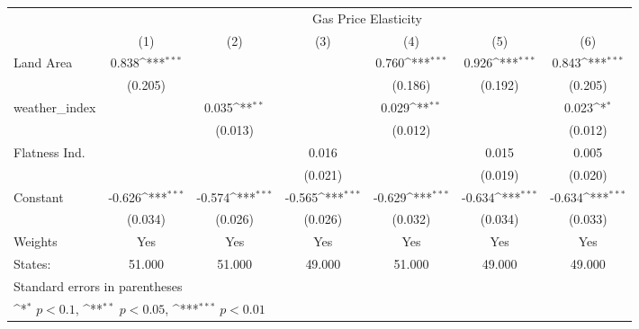 {
\def\sym#1{\ifmmode^{#1}\else\(^{#1}\)\fi}
\begin{tabular}{l*{6}{c}}
\hline\hline
            &\multicolumn{6}{c}{Gas Price Elasticity}                                                                                           \\
            &\multicolumn{1}{c}{(1)}         &\multicolumn{1}{c}{(2)}         &\multicolumn{1}{c}{(3)}         &\multicolumn{1}{c}{(4)}         &\multicolumn{1}{c}{(5)}         &\multicolumn{1}{c}{(6)}         \\
\hline
Land Area   &       0.838\sym{***}&                     &                     &       0.760\sym{***}&       0.926\sym{***}&       0.843\sym{***}\\
            &     (0.205)         &                     &                     &     (0.186)         &     (0.192)         &     (0.205)         \\
[1em]
weather\_index&                     &       0.035\sym{**} &                     &       0.029\sym{**} &                     &       0.023\sym{*}  \\
            &                     &     (0.013)         &                     &     (0.012)         &                     &     (0.012)         \\
[1em]
Flatness Ind.&                     &                     &       0.016         &                     &       0.015         &       0.005         \\
            &                     &                     &     (0.021)         &                     &     (0.019)         &     (0.020)         \\
[1em]
Constant    &      -0.626\sym{***}&      -0.574\sym{***}&      -0.565\sym{***}&      -0.629\sym{***}&      -0.634\sym{***}&      -0.634\sym{***}\\
            &     (0.034)         &     (0.026)         &     (0.026)         &     (0.032)         &     (0.034)         &     (0.033)         \\
\hline
Weights     &         Yes         &         Yes         &         Yes         &         Yes         &         Yes         &         Yes         \\
States:     &      51.000         &      51.000         &      49.000         &      51.000         &      49.000         &      49.000         \\
\hline\hline
\multicolumn{7}{l}{\footnotesize Standard errors in parentheses}\\
\multicolumn{7}{l}{\footnotesize \sym{*} \(p<0.1\), \sym{**} \(p<0.05\), \sym{***} \(p<0.01\)}\\
\end{tabular}
}
